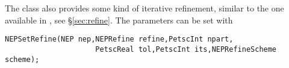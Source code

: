 The  class also provides some kind of iterative refinement, similar to the one available in , see \S\ref{sec:refine}. The parameters can be set with
	\begin{Verbatim}[fontsize=\small]
	NEPSetRefine(NEP nep,NEPRefine refine,PetscInt npart,
                     PetscReal tol,PetscInt its,NEPRefineScheme scheme);
	\end{Verbatim}



